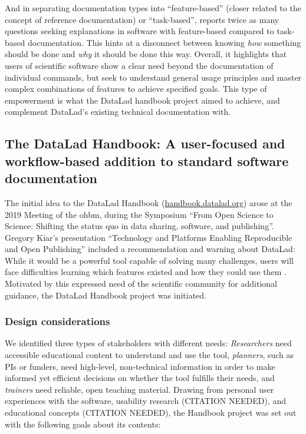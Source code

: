 And in separating documentation types into ``feature-based'' (closer related to the concept of reference documentation) or ``task-based'',  \citet{swarts2019open} reports twice as many questions seeking explanations in software with feature-based compared to task-based documentation.
This hints at a disconnect between knowing \textit{how} something should be done and \textit{why} it should be done this way.
Overall, it highlights that users of scientific software show a clear need beyond the documentation of individual commands, but seek to understand general usage principles and master complex combinations of features to achieve specified goals.
This type of empowerment is what the DataLad handbook project aimed to achieve, and complement DataLad's existing technical documentation with.



\subsection{The DataLad Handbook: A user-focused and workflow-based addition to standard software documentation}

The initial idea to the DataLad Handbook (\href{http://handbook.datalad.org}{handbook.datalad.org}) arose at the 2019 Meeting of the \gls{ohbm}, during the Symposium ``From Open Science to Science: Shifting the status quo in data sharing, software, and publishing''.
Gregory Kiar's presentation ``Technology and Platforms Enabling Reproducible and Open Publishing'' included a recommendation and warning about DataLad: While it would be a powerful tool capable of solving many challenges, users will face difficulties learning which features existed and how they could use them \citep{kiar}.
Motivated by this expressed need of the scientific community for additional guidance, the DataLad Handbook project was initiated.

\subsubsection{Design considerations}
We identified three types of stakeholders with different needs: \textit{Researchers} need accessible educational content to understand and use the tool, \textit{planners}, such as PIs or funders, need high-level, non-technical information in order to make informed yet efficient decisions on whether the tool fulfills their needs, and \textit{trainers} need reliable, open teaching material.
Drawing from personal user experiences with the software, usability research (CITATION NEEDED), and educational concepts (CITATION NEEDED), the Handbook project was set out with the following goals about its contents:

